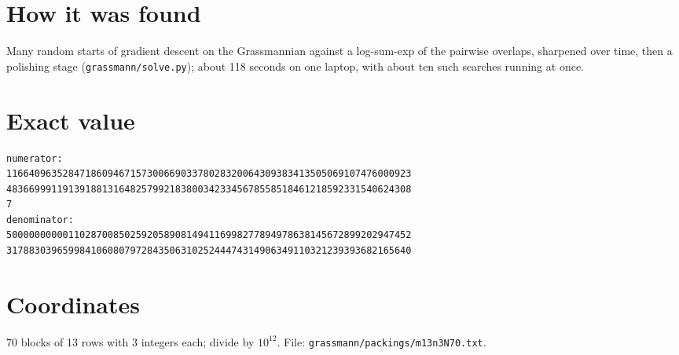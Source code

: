 \documentclass[11pt,a4paper]{article}
\begin{document}
\section{How it was found}
Many random starts of gradient descent on the Grassmannian against a log-sum-exp of the pairwise overlaps, sharpened over time, then a polishing stage (\texttt{grassmann/solve.py}); about 118 seconds on one laptop, with about ten such searches running at once.


\appendix
\section{Exact value}
{\small
\begin{verbatim}
numerator:
116640963528471860946715730066903378028320064309383413505069107476000923
483669991191391881316482579921838003423345678558518461218592331540624308
7
denominator:
500000000001102870085025920589081494116998277894978638145672899202947452
317883039659984106080797284350631025244474314906349110321239393682165640
\end{verbatim}}

\section{Coordinates}
70 blocks of 13 rows with 3 integers each; divide by $10^{12}$. File: \texttt{grassmann/packings/m13n3N70.txt}.
{\tiny
\begin{multicols}{3}
\end{multicols}}
\end{document}
